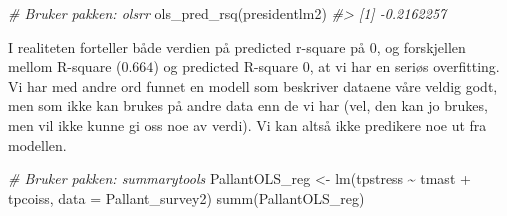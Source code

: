 \documentclass[
]{article}
\newenvironment{Shaded}{\begin{snugshade}}{\end{snugshade}}
\newcommand{\AttributeTok}[1]{\textcolor[rgb]{0.77,0.63,0.00}{#1}}
\newcommand{\CommentTok}[1]{\textcolor[rgb]{0.56,0.35,0.01}{\textit{#1}}}
\newcommand{\FunctionTok}[1]{\textcolor[rgb]{0.00,0.00,0.00}{#1}}
\newcommand{\NormalTok}[1]{#1}
\newcommand{\OtherTok}[1]{\textcolor[rgb]{0.56,0.35,0.01}{#1}}
\newcommand{\SpecialCharTok}[1]{\textcolor[rgb]{0.00,0.00,0.00}{#1}}
\begin{document}
\begin{Shaded}
\begin{Highlighting}[]
\CommentTok{\# Bruker pakken: olsrr}
\FunctionTok{ols\_pred\_rsq}\NormalTok{(presidentlm2)}
\CommentTok{\#\textgreater{} [1] {-}0.2162257}
\end{Highlighting}
\end{Shaded}

I realiteten forteller både verdien på predicted r-square på 0, og forskjellen mellom R-square (\(0.664\)) og predicted R-square \(0\), at vi har en seriøs overfitting. Vi har med andre ord funnet en modell som beskriver dataene våre veldig godt, men som ikke kan brukes på andre data enn de vi har (vel, den kan jo brukes, men vil ikke kunne gi oss noe av verdi). Vi kan altså ikke predikere noe ut fra modellen.

\begin{Shaded}
\begin{Highlighting}[]
\CommentTok{\# Bruker pakken: summarytools}
\NormalTok{PallantOLS\_reg }\OtherTok{\textless{}{-}} \FunctionTok{lm}\NormalTok{(tpstress }\SpecialCharTok{\textasciitilde{}}\NormalTok{ tmast }\SpecialCharTok{+}\NormalTok{ tpcoiss, }\AttributeTok{data =}\NormalTok{ Pallant\_survey2)}
\FunctionTok{summ}\NormalTok{(PallantOLS\_reg)}
\end{Highlighting}
\end{Shaded}
\end{document}
